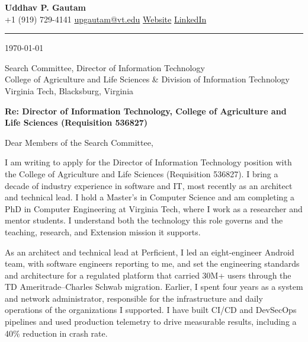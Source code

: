 \documentclass[11pt]{article}
\begin{document}
\begin{center}
{\LARGE\bfseries Uddhav P. Gautam}\\[0.4em]
{\small
+1 (919) 729-4141 \;\textbullet\;
\href{mailto:upgautam@vt.edu}{upgautam@vt.edu}
\;\textbullet\;
\href{https://uddhavpgautam.github.io}{Website}
\;\textbullet\;
\href{https://www.linkedin.com/in/uddhavpgautam/}{LinkedIn}
}
\end{center}

\vspace{3pt}
\hrule
\vspace{12pt}

\today

\vspace{8pt}

Search Committee, Director of Information Technology\\
College of Agriculture and Life Sciences \& Division of Information Technology\\
Virginia Tech, Blacksburg, Virginia

\vspace{6pt}
\textbf{Re: Director of Information Technology, College of Agriculture and Life Sciences (Requisition 536827)}

\vspace{6pt}
Dear Members of the Search Committee,

I am writing to apply for the Director of Information Technology position with the College of Agriculture and Life Sciences (Requisition 536827). I bring a decade of industry experience in software and IT, most recently as an architect and technical lead. I hold a Master's in Computer Science and am completing a PhD in Computer Engineering at Virginia Tech, where I work as a researcher and mentor students. I understand both the technology this role governs and the teaching, research, and Extension mission it supports.

As an architect and technical lead at Perficient, I led an eight-engineer Android team, with software engineers reporting to me, and set the engineering standards and architecture for a regulated platform that carried 30M+ users through the TD Ameritrade--Charles Schwab migration. Earlier, I spent four years as a system and network administrator, responsible for the infrastructure and daily operations of the organizations I supported. I have built CI/CD and DevSecOps pipelines and used production telemetry to drive measurable results, including a 40\% reduction in crash rate.
\end{document}
